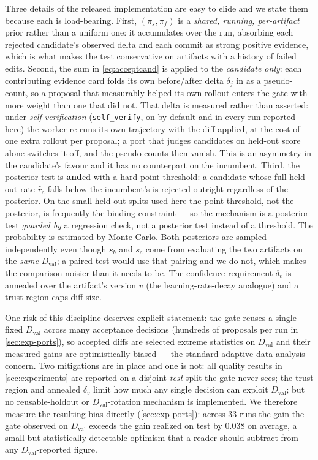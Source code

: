 \documentclass{article}
\newcommand{\code}[1]{\texttt{#1}}
\newcommand{\Dval}{D_{\mathrm{val}}}
\begin{document}
Three details of the released implementation are easy to elide and we state them because each is load-bearing. First, $(\pi_s, \pi_f)$ is a \emph{shared, running, per-artifact} prior rather than a uniform one: it accumulates over the run, absorbing each rejected candidate's observed delta and each commit as strong positive evidence, which is what makes the test conservative on artifacts with a history of failed edits. Second, the sum in \cref{eq:acceptcand} is applied to the \emph{candidate only}: each contributing evidence card folds its own before/after delta $\delta_j$ in as a pseudo-count, so a proposal that measurably helped its own rollout enters the gate with more weight than one that did not. That delta is measured rather than asserted: under \emph{self-verification} (\code{self\_verify}, on by default and in every run reported here) the worker re-runs its own trajectory with the diff applied, at the cost of one extra rollout per proposal; a port that judges candidates on held-out score alone switches it off, and the pseudo-counts then vanish. This is an asymmetry in the candidate's favour and it has no counterpart on the incumbent. Third, the posterior test is \textbf{and}ed with a hard point threshold: a candidate whose full held-out rate $\hat r_c$ falls below the incumbent's is rejected outright regardless of the posterior. On the small held-out splits used here the point threshold, not the posterior, is frequently the binding constraint --- so the mechanism is a posterior test \emph{guarded by} a regression check, not a posterior test instead of a threshold. The probability is estimated by Monte Carlo. Both posteriors are sampled independently even though $s_b$ and $s_c$ come from evaluating the two artifacts on the \emph{same} $\Dval$; a paired test would use that pairing and we do not, which makes the comparison noisier than it needs to be. The confidence requirement $\delta_v$ is annealed over the artifact's version $v$ (the learning-rate-decay analogue) and a trust region caps diff size.

One risk of this discipline deserves explicit statement: the gate reuses a single fixed $\Dval$ across many acceptance decisions (hundreds of proposals per run in \cref{sec:exp-ports}), so accepted diffs are selected extreme statistics on $\Dval$ and their measured gains are optimistically biased --- the standard adaptive-data-analysis concern. Two mitigations are in place and one is not: all quality results in \cref{sec:experiments} are reported on a disjoint \emph{test} split the gate never sees; the trust region and annealed $\delta_v$ limit how much any single decision can exploit $\Dval$; but no reusable-holdout or $\Dval$-rotation mechanism is implemented. We therefore measure the resulting bias directly (\cref{sec:exp-ports}): across 33 runs the gain the gate observed on $\Dval$ exceeds the gain realized on test by $0.038$ on average, a small but statistically detectable optimism that a reader should subtract from any $\Dval$-reported figure.
\end{document}
